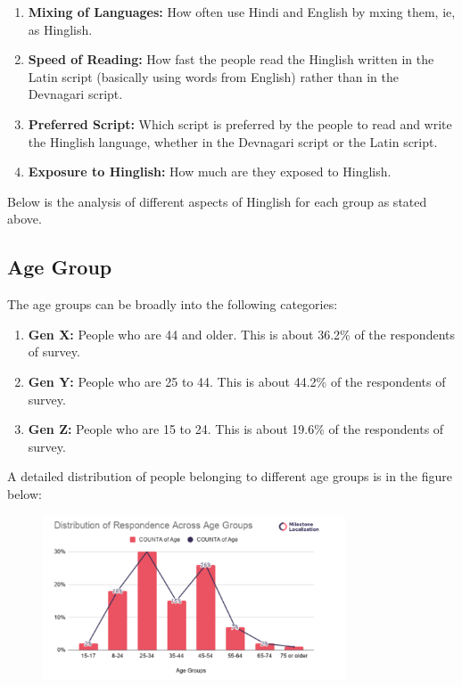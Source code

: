 \documentclass{article}
\begin{document}
\begin{enumerate}
    \item \textbf{Mixing of Languages:} How often use Hindi and English by mxing them, ie, as Hinglish.
    \item \textbf{Speed of Reading:} How fast the people read the Hinglish written in the Latin script (basically using words from English) rather than in the Devnagari script.
    \item \textbf{Preferred Script:} Which script is preferred by the people to read and write the Hinglish language, whether in the Devnagari script or the Latin script.
    \item \textbf{Exposure to Hinglish:} How much are they exposed to Hinglish.
\end{enumerate}
Below is the analysis of different aspects of Hinglish for each group as stated above.

\subsection{Age Group}
The age groups can be broadly into the following categories:
\begin{enumerate}
    \item \textbf{Gen X:} People who are 44 and older. This is about 36.2\% of the respondents of survey.
    \item \textbf{Gen Y:} People who are 25 to 44. This is about 44.2\% of the respondents of survey.
    \item \textbf{Gen Z:} People who are 15 to 24. This is about 19.6\% of the respondents of survey.
\end{enumerate}
A detailed distribution of people belonging to different age groups is in the figure below:
\begin{figure}[H]
    \centering
    \includegraphics[width=0.8\textwidth]{plots/distribution_with_age.png}
\end{figure}
\end{document}
